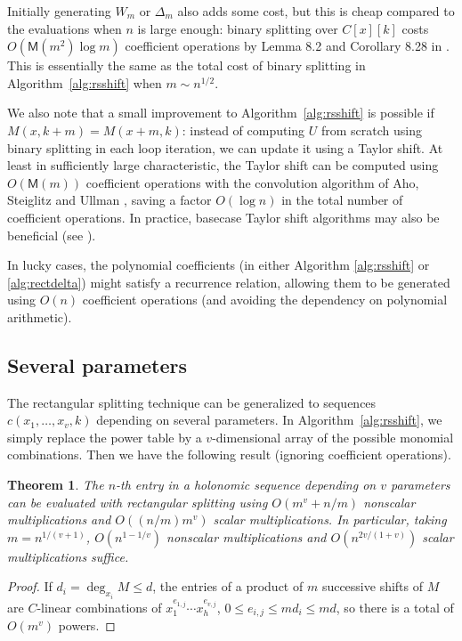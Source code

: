 \documentclass{sig-alternate}
\newtheorem{theorem}{Theorem}
\newcommand   \M      {\mathsf{M}}
\begin{document}
Initially generating $W_m$ or $\Delta_m$ also adds some cost,
but this is cheap compared to the evaluations when $n$ is
large enough: binary splitting over $C[x][k]$
costs $O(\M(m^2) \log m)$ coefficient operations by
Lemma 8.2 and Corollary 8.28 in \cite{vonzurGathenGerhard2003}.
This is essentially the same as the total cost of binary
splitting in Algorithm~\ref{alg:rsshift} when $m \sim n^{1/2}$.

We also note that a small improvement to Algorithm~\ref{alg:rsshift}
is possible if $M(x,k+m) = M(x+m,k)$:
instead of computing $U$ from scratch using binary splitting
in each loop iteration, we can update it using a Taylor shift.
At least in sufficiently large characteristic,
the Taylor shift can be computed using $O(\M(m))$ coefficient
operations with the
convolution algorithm of Aho, Steiglitz and Ullman \cite{Aho1975evaluating},
saving a factor $O(\log n)$ in the total number of coefficient operations.
In practice,
basecase Taylor shift algorithms may also be beneficial (see \cite{von1997fast}).

In lucky cases, the polynomial coefficients (in either
Algorithm \ref{alg:rsshift} or \ref{alg:rectdelta}) might
satisfy a recurrence relation, allowing them
to be generated using $O(n)$ coefficient operations
(and avoiding the dependency on polynomial arithmetic).



\subsection{Several parameters}

The rectangular splitting technique can be generalized
to sequences $c(x_1,\ldots,x_v,k)$ depending on several parameters.
In Algorithm~\ref{alg:rsshift}, we simply replace the power
table by a $v$-dimensional array of the possible
monomial combinations. Then we 
have the following result (ignoring coefficient operations).

\begin{theorem}
The $n$-th entry in a holonomic sequence depending on $v$ parameters
can be evaluated with rectangular splitting
using $O(m^v + n/m)$ nonscalar multiplications and
$O((n/m) m^v)$ scalar multiplications.
In particular, taking $m = n^{1/(v+1)}$, $O(n^{1-1/v})$
nonscalar multiplications and $O(n^{2v / (1+v)})$ scalar multiplications
suffice.
\label{thm:several}
\end{theorem}

\begin{proof}
If $d_i = \operatorname{deg}_{x_i} M \le d$, the entries of a
product of $m$ successive shifts of $M$ are $C$-linear
combinations of $x_1^{e_{1,j}} \cdots x_h^{e_{v,j}}$,
$0 \le e_{i,j} \le m d_i \le md$, so there is a total of $O(m^v)$ powers.
\end{proof}
\end{document}
